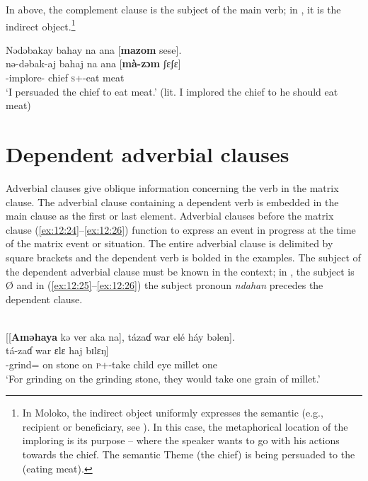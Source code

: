 In  above, the complement clause is the subject of the main verb; in , it is the indirect object.\footnote{In Moloko, the indirect object uniformly expresses the semantic {\LOC} (e.g., recipient or beneficiary, see ). In this case, the metaphorical location of the imploring is its purpose -- where the speaker wants to go with his actions towards the chief. The semantic Theme (the chief) is being persuaded to the {\LOC} (eating meat).} 

\clearpage
\ea \label{ex:12:23}
Nədəbakay  bahay  na  ana  [\textbf{mazom}  sese].\\
\gll  nə-dəbak-aj   bahaj   na   ana   [\textbf{mà-zɔm}  ʃɛʃɛ]\\
      {\oneS}-implore{}-{\CL}  chief  {\PSP}  {\DAT} \textsc{s}+{\HOR}-eat  meat\\
\glt  ‘I persuaded the chief to eat meat.’ (lit. I implored the chief to he should eat meat)
\z 

\section{Dependent adverbial clauses}\label{sec:12.2}
\hypertarget{RefHeading1213401525720847}{}
Adverbial clauses give oblique information concerning the verb in the matrix clause. The adverbial clause containing a dependent verb is embedded in the main clause as the first or last element. Adverbial clauses before the matrix clause (\ref{ex:12:24}--\ref{ex:12:26}) function to express an event in progress at the time of the matrix event or situation. The entire adverbial clause is delimited by square brackets and the dependent verb is bolded in the examples. The subject of the dependent adverbial clause must be known in the context; in , the subject is Ø  and in (\ref{ex:12:25}--\ref{ex:12:26}) the subject pronoun \textit{ndahan} precedes the dependent clause. 

\ea \label{ex:12:24}
\\
{}[[\textbf{Aməhaya}  kə  ver  aka  na],  tázaɗ  war  elé  háy  bəlen].\\
\gll  [[Ø  \textbf{amə-h=aja}  kə  vɛr  aka  na]  tá-zaɗ          war   ɛlɛ  haj     bɪlɛŋ]\\
      {} {\DEP}-grind={\PLU}  on     stone  on  {\PSP}  \textsc{p}+{\IFV}-take  child   eye  millet  one\\
\glt  ‘For grinding on the grinding stone, they would take one grain of millet.’ 
\z 

